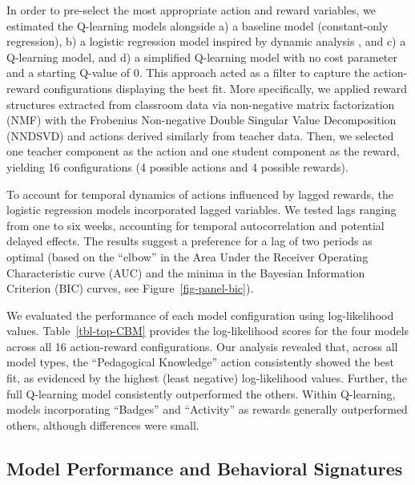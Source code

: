 \documentclass[
  number,
  preprint,
  3p,
  onecolumn]{elsarticle}
\begin{document}
In order to pre-select the most appropriate action and reward variables,
we estimated the Q-learning models alongside a) a baseline model
(constant-only regression), b) a logistic regression model inspired by
dynamic analysis \citep{lau2005}, and c) a Q-learning model, and d) a
simplified Q-learning model with no cost parameter and a starting
Q-value of 0. This approach acted as a filter to capture the
action-reward configurations displaying the best fit. More specifically,
we applied reward structures extracted from classroom data via
non-negative matrix factorization (NMF) with the Frobenius Non-negative
Double Singular Value Decomposition (NNDSVD) and actions derived
similarly from teacher data. Then, we selected one teacher component as
the action and one student component as the reward, yielding 16
configurations (4 possible actions and 4 possible rewards).

To account for temporal dynamics of actions influenced by lagged
rewards, the logistic regression models incorporated lagged variables.
We tested lags ranging from one to six weeks, accounting for temporal
autocorrelation and potential delayed effects. The results suggest a
preference for a lag of two periods as optimal (based on the ``elbow''
in the Area Under the Receiver Operating Characteristic curve (AUC) and
the minima in the Bayesian Information Criterion (BIC) curves, see
Figure~\ref{fig-panel-bic}).

We evaluated the performance of each model configuration using
log-likelihood values. Table~\ref{tbl-top-CBM} provides the
log-likelihood scores for the four models across all 16 action-reward
configurations. Our analysis revealed that, across all model types, the
``Pedagogical Knowledge'' action consistently showed the best fit, as
evidenced by the highest (least negative) log-likelihood values.
Further, the full Q-learning model consistently outperformed the others.
Within Q-learning, models incorporating ``Badges'' and ``Activity'' as
rewards generally outperformed others, although differences were small.

\subsection{Model Performance and Behavioral
Signatures}\label{model-performance-and-behavioral-signatures}
\end{document}
